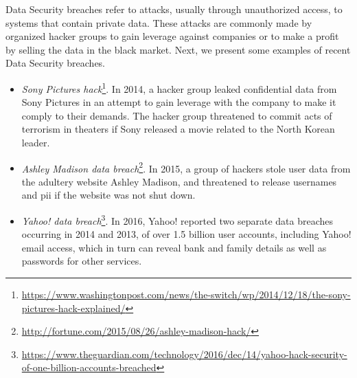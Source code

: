 Data Security breaches refer to attacks, usually through unauthorized access, to systems that contain private data. These attacks are commonly made by organized hacker groups to gain leverage against companies or to make a profit by selling the data in the black market. Next, we present some examples of recent Data Security breaches.
\begin{itemize}

    \item \textit{Sony Pictures hack}\footnote{\url{https://www.washingtonpost.com/news/the-switch/wp/2014/12/18/the-sony-pictures-hack-explained/}}. In 2014, a hacker group leaked confidential data from Sony Pictures in an attempt to gain leverage with the company to make it comply to their demands. The hacker group threatened to commit acts of terrorism in theaters if Sony released a movie related to the North Korean leader.


    \item \textit{Ashley Madison data breach}\footnote{\url{http://fortune.com/2015/08/26/ashley-madison-hack/}}. In 2015, a group of hackers stole user data from the adultery website Ashley Madison, and threatened to release usernames and \ac{pii} if the website was not shut down.

    \item \textit{Yahoo! data breach}\footnote{\url{https://www.theguardian.com/technology/2016/dec/14/yahoo-hack-security-of-one-billion-accounts-breached}}. In 2016, Yahoo! reported two separate data breaches occurring in 2014 and 2013, of over 1.5 billion user accounts, including Yahoo! email access, which in turn can reveal bank and family details as well as passwords for other services.


\end{itemize}




